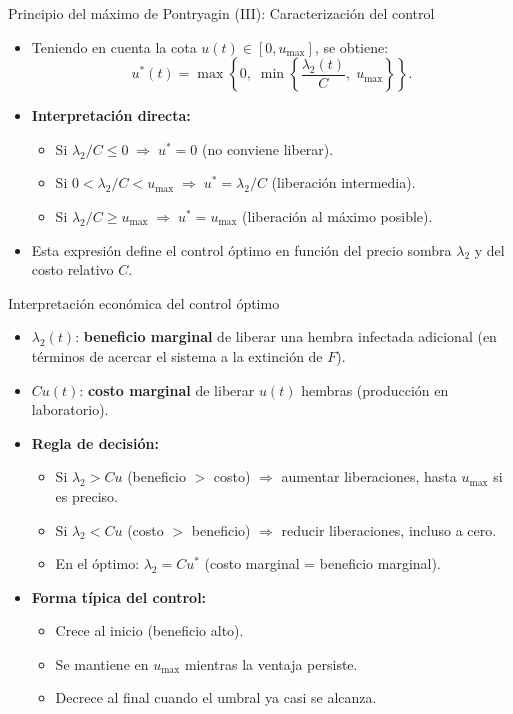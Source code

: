 \documentclass[10pt, aspectratio=169]{beamer}
\newcommand{\tb}{\textbf}
\begin{document}
\begin{frame}{Principio del máximo de Pontryagin (III): Caracterización del control}
\begin{itemize}
    \item Teniendo en cuenta la cota $u(t) \in [0, u_{\max}]$, se obtiene:
          \[
          u^*(t) = \max\left\{0,\;\min\left\{\frac{\lambda_2(t)}{C},\; u_{\max}\right\}\right\}.
          \]
    \item \textbf{Interpretación directa:}
          \begin{itemize}
              \item Si $\lambda_2/C \le 0 \;\Rightarrow\; u^*=0$ (no conviene liberar).
              \item Si $0 < \lambda_2/C < u_{\max} \;\Rightarrow\; u^*=\lambda_2/C$ 
                    (liberación intermedia).
              \item Si $\lambda_2/C \ge u_{\max} \;\Rightarrow\; u^*=u_{\max}$ 
                    (liberación al máximo posible).
          \end{itemize}
    \item Esta expresión define el control óptimo en función del precio sombra 
          $\lambda_2$ y del costo relativo $C$.
\end{itemize}
\end{frame}
\begin{frame}{Interpretación económica del control óptimo}
\begin{itemize}
    \item $\lambda_2(t)$: \tb{beneficio marginal} de liberar una hembra infectada 
          adicional (en términos de acercar el sistema a la extinción de $F$).
    \item $C u(t)$: \tb{costo marginal} de liberar $u(t)$ hembras 
          (producción en laboratorio).
    \item \textbf{Regla de decisión:}
          \begin{itemize}
              \item Si $\lambda_2 > C u$ (beneficio $>$ costo) 
                    $\Rightarrow$ aumentar liberaciones, hasta $u_{\max}$ si es preciso.
              \item Si $\lambda_2 < C u$ (costo $>$ beneficio) 
                    $\Rightarrow$ reducir liberaciones, incluso a cero.
              \item En el óptimo: $\lambda_2 = C u^*$ 
                    (costo marginal = beneficio marginal).
          \end{itemize}
    \item \textbf{Forma típica del control:}
          \begin{itemize}
              \item Crece al inicio (beneficio alto).
              \item Se mantiene en $u_{\max}$ mientras la ventaja persiste.
              \item Decrece al final cuando el umbral ya casi se alcanza.
          \end{itemize}
\end{itemize}
\end{frame}
\end{document}
